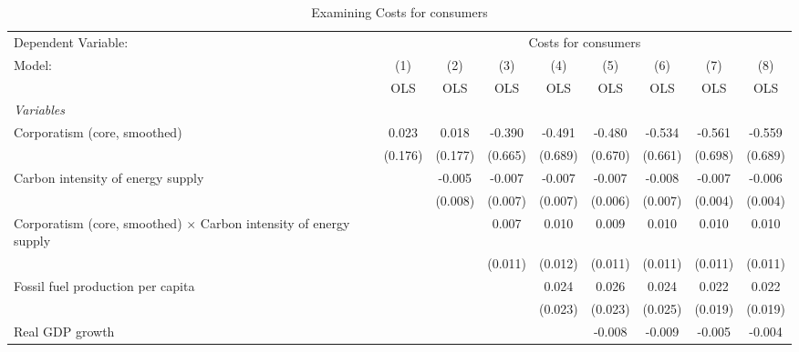 
\begin{table}[htbp]
   \caption{Examining Costs for consumers}
   \centering
   \begin{tabular}{lcccccccc}
      \toprule
      Dependent Variable: & \multicolumn{8}{c}{Costs for consumers}\\
      Model:                                                                   & (1)     & (2)     & (3)     & (4)     & (5)     & (6)     & (7)     & (8)\\  
                                                                               &  OLS    & OLS     & OLS     & OLS     & OLS     & OLS     & OLS     & OLS\\  
      \midrule
      \emph{Variables}\\
      Corporatism (core, smoothed)                                             & 0.023   & 0.018   & -0.390  & -0.491  & -0.480  & -0.534  & -0.561  & -0.559\\   
                                                                               & (0.176) & (0.177) & (0.665) & (0.689) & (0.670) & (0.661) & (0.698) & (0.689)\\   
      Carbon intensity of energy supply                                        &         & -0.005  & -0.007  & -0.007  & -0.007  & -0.008  & -0.007  & -0.006\\   
                                                                               &         & (0.008) & (0.007) & (0.007) & (0.006) & (0.007) & (0.004) & (0.004)\\   
      Corporatism (core, smoothed) $\times$ Carbon intensity of energy supply  &         &         & 0.007   & 0.010   & 0.009   & 0.010   & 0.010   & 0.010\\   
                                                                               &         &         & (0.011) & (0.012) & (0.011) & (0.011) & (0.011) & (0.011)\\   
      Fossil fuel production per capita                                        &         &         &         & 0.024   & 0.026   & 0.024   & 0.022   & 0.022\\   
                                                                               &         &         &         & (0.023) & (0.023) & (0.025) & (0.019) & (0.019)\\   
      Real GDP growth                                                          &         &         &         &         & -0.008  & -0.009  & -0.005  & -0.004\\   

\end{tabular}
\end{table}
